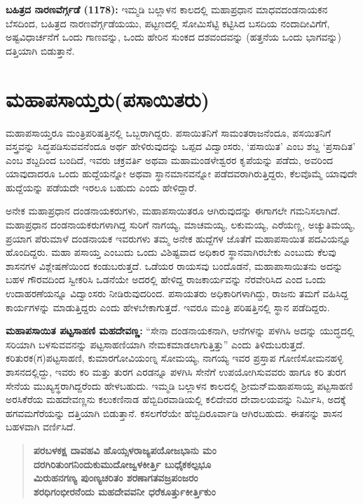 \textbf{ಬಹಿತ್ರದ ನಾರಣವೆರ್ಗ್ಗಡೆ (1178):} ಇಮ್ಮಡಿ ಬಲ್ಲಾಳನ ಕಾಲದಲ್ಲಿ ಮಹಾಪ್ರಧಾನ ಮಾಧವದಂಡನಾಯಕನ ಬೆಸದಿಂದ, ಬಹಿತ್ರದ ನಾರಣವೆರ್ಗ್ಗಡೆಯಯು, ಪಟ್ಟಣದಲ್ಲಿ ಸೋಮಿಸೆಟ್ಟಿ ಕಟ್ಟಿಸಿದ ಬಸದಿಯ ನಂದಾದೀವಿಗೆಗೆ, ಅಷ್ಟವಿಧಾರ್ಚನೆಗೆ ಒಂದು ಗಾಣವನ್ನು, ಒಂದು ಹೇರಿನ ಸುಂಕದ ದಶವಂದವನ್ನು (ಹತ್ತನೆಯ ಒಂದು ಭಾಗವನ್ನು) ದತ್ತಿಯಾಗಿ ಬಿಡುತ್ತಾನೆ.


\section{ಮಹಾಪಸಾಯ್ತರು(ಪಸಾಯಿತರು)}

ಮಹಾಪಸಾಯ್ತರೂ ಮಂತ್ರಿಪರಿಷತ್ತಿನಲ್ಲಿ ಒಬ್ಬರಾಗಿದ್ದರು. ಪಸಾಯಿತನಿಗೆ ಸಾಮಂತರಾಜನೆಂದೂ, ಪಸಯಿತನಿಗೆ ವಸ್ತ್ರವನ್ನು ಸಿದ್ಧಪಡಿಸುವವನೆಂದೂ ಅರ್ಥ ಹೇಳಿರುವುದನ್ನು ಒಪ್ಪದ ವಿದ್ವಾಂಸರು, ‘ಪಸಾಯಿತ’ ಎಂಬ ಶಬ್ದ ‘ಪ್ರಸಾದಿತ’ ಎಂಬ ಶಬ್ದದಿಂದ ಬಂದಿದೆ, ಇವರು ಚಕ್ರವರ್ತಿ ಅಥವಾ ಮಹಾಮಂಡಳೇಶ್ವರರ ಕೃಪೆಯನ್ನು ಪಡೆದು, ಅವರಿಂದ ಯಾವುದಾದರೂ ಒಂದು ಹುದ್ದೆಯನ್ನೋ ಅಥವಾ ಸ್ಥಾನಮಾನವನ್ನೋ ಪಡೆದವರಾಗಿರುತ್ತಿದ್ದರು, ಕೆಲವೊಮ್ಮೆ ಯಾವುದೇ ಹುದ್ದೆಯನ್ನು ಪಡೆಯದೇ ಇರಲೂ ಬಹುದು ಎಂದು ಹೇಳಿದ್ದಾರೆ.

ಅನೇಕ ಮಹಾಪ್ರಧಾನ ದಂಡನಾಯಕರುಗಳು, ಮಹಾಪಸಾಯಿತರೂ ಆಗಿರುವುದನ್ನು ಈಗಾಗಲೇ ಗಮನಿಸಲಾಗಿದೆ. ಮಹಾಪ್ರಧಾನ ದಂಡನಾಯಕರುಗಳಾಗಿದ್ದ ಸುರಿಗೆ ನಾಗಯ್ಯ, ಮಾಚಮಯ್ಯ, ಲಕುಮಯ್ಯ, ಎರೆಯಣ್ಣ, ಅಚ್ಯುತಿಮಯ್ಯ, ಪ್ರಯಾಗ ಪೆರುಮಾಳೆ ದಂಡನಾಯಕ ಇವರುಗಳು ತಮ್ಮ ಅನೇಕ ಹುದ್ದೆಗಳ ಜೊತೆಗೆ ಮಹಾಪಸಾಯಿತ ಪದವಿಯನ್ನೂ ಹೊಂದಿದ್ದರು. ಮಹಾ ಪಸಾಯ್ತ ಎಂಬುದು ಒಂದು ವಿಶಿಷ್ಟವಾದ ಅಧಿಕಾರ ಸ್ಥಾನವಾಗಿರಬೇಕು ಎಂಬುದು ಕೆಲವು ಶಾಸನಗಳ ವಿಶ್ಲೇಷಣೆಯಿಂದ ಕಂಡುಬರುತ್ತದೆ. ಒಡೆಯರ ರಾಯಸವು ಬಂದೊಡನೆ, ಮಹಾಪಾಸಾಯಿತನು ಅದನ್ನು ಬಹಳ ಗೌರವದಿಂದ ಸ್ವೀಕರಿಸಿ ಒಡನೆಯೇ ಅದರಲ್ಲಿ ಹೇಳಿದ್ದ ರಾಜಕಾರ್ಯವನ್ನು ನೆರವೇರಿಸಿದ ಎಂದ ಒಂದು ಉದಾಹರಣೆಯನ್ನೂ ವಿದ್ವಾಂಸರು ನೀಡಿರುವುದರಿಂದ. ಪಸಾಯತರು ಅಧಿಕಾರಿಗಳಾಗಿದ್ದು, ರಾಜನು ತಮಗೆ ವಹಿಸಿದ್ದ ಕಾರ್ಯಗಳನ್ನು ಮಾಡುತ್ತಿದ್ದರು ಎಂದು ಹೇಳಬೇಕಾಗುತ್ತದೆ. ಇವರೂ ಮಂತ್ರಿ ಪರಿಷತ್ತಿನಲ್ಲಿ ಸ್ಥಾನ ಪಡೆದಿದ್ದರು.

\textbf{ಮಹಾಪಸಾಯಿತ ಪಟ್ಟಸಾಹಣಿ ಮಹದೇವಣ್ಣ:} “ಸೇನಾ ದಂಡನಾಯಕನಾಗಿ, ಆನೆಗಳನ್ನು ಪಳಗಿಸಿ ಅದನ್ನು ಯುದ್ಧದಲ್ಲಿ ಸರಿಯಾಗಿ ಬಳಸುವವನನ್ನು ಪಟ್ಟಸಾಹಣಿಯಾಗಿ ನೇಮಕಮಾಡಲಾಗುತ್ತಿತ್ತು” ಎಂದು ತಿಳಿದುಬರುತ್ತದೆ. ಕರಿತುರಕ(ಗ)ಪಟ್ಟಸಾಹಣಿ, ಕುಮಾರಗೋವಿಯಂಣ್ನ ಸೋಮಯ್ಯ, ನಾಗಯ್ಯ ಇವರ ಪ್ರಸ್ತಾಪ ಗೋಣಿಸೋಮನಹಳ್ಳಿ ಶಾಸನದಲ್ಲಿದ್ದು, ಇವರು ಕರಿ ಮತ್ತು ತುರಗ ಎರಡನ್ನೂ ಪಳಗಿಸಿ ಸೇನೆಗೆ ಉಪಯೋಗಿಸುವವರು ಹಾಗೂ ಕರಿ ತುರಗ ಸೇನೆಯ ಮುಖ್ಯಸ್ಥರಾಗಿದ್ದರೆಂದು ಹೇಳಬಹುದು. ಇಮ್ಮಡಿ ಬಲ್ಲಾಳನ ಕಾಲದಲ್ಲಿ ಶ‍್ರೀಮನ್​ ಮಹಾಪಸಾಯ್ತ ಪಟ್ಟಸಾಹಣಿ ಅರಸಿಕೆರೆಯ ಮಹದೇವಣ್ಣನು ಕಲುಕಣಿನಾಡ ಹೆಬ್ಬಿದಿರವಾಡಿಯಲ್ಲಿ ಕಲಿದೇವರ ದೇವಾಲಯವನ್ನು ನಿರ್ಮಿಸಿ, ಅದಕ್ಕೆ ಹಗವಮಗೆರೆಯನ್ನು ದತ್ತಿಯಾಗಿ ಬಿಡುತ್ತಾನೆ. ಕಸಲಗೆರೆಯೇ ಹೆಬ್ಬಿದಿರೂರ್ವಾಡಿ ಆಗಿರಬಹುದು. ಈತನನ್ನು ಶಾಸನ ಬಹಳವಾಗಿ ವರ್ಣಿಸಿದೆ.

\begin{verse}
\textbf{ಪರಬಳಕಕ್ಷ ದಾವಹವಿ ಹೊಯ್ಸಳರಾಜ್ಯಪಯೋಜಭಾನು ಮಂ} \\\textbf{ದರಗಿರಿತುಂಗನಿಂದುಕುಮುದೋಜ್ವಳಕೀರ್ತ್ತಿ ಬುಧೈಕಕಲ್ಪಭೂ} \\\textbf{ಮಿರುಹನಗಣ್ಯ ಪುಂಣ್ಯಚರಿತಂ ಶರಣಾಗತವಜ್ರಪಂಜರಂ} \\\textbf{ಶರಧಿಗಂಭೀರನೆಂದು ಮಹದೇವವನೀ ಧರೆಕೂರ್ತ್ತುಕೀರ್ತ್ತಿಕುಂ}
\end{verse}

